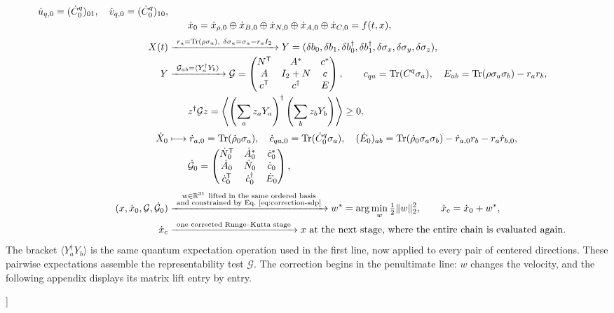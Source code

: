 \documentclass[10pt,twocolumn]{article}
\newcommand{\R}{\mathbb R}
\newcommand{\I}{I}
\newcommand{\Tr}{\operatorname{Tr}}
\newcommand{\norm}[1]{\lVert#1\rVert}
\begin{document}
{\begin{minipage}{0.97\textwidth}
\begin{equation}
\begin{aligned}
\dot u_{q,0}=(\dot C^q_0)_{01},\quad \dot v_{q,0}=(\dot C^q_0)_{10},\\[-1pt]
&\hspace{2.0em}
\dot x_0=\dot x_{\rho,0}\oplus\dot x_{B,0}\oplus\dot x_{N,0}
\oplus\dot x_{A,0}\oplus\dot x_{C,0}=f(t,x),\\[2pt]
X(t)
&\xrightarrow{\ r_a=\Tr(\rho\sigma_a),\ \delta\sigma_a=\sigma_a-r_a\I_2\ }
Y=(\delta b_0,\delta b_1,\delta b_0^\dagger,\delta b_1^\dagger,
\delta\sigma_x,\delta\sigma_y,\delta\sigma_z),\\[-1pt]
Y
&\xrightarrow{\ \mathcal G_{ab}=\langle Y_a^\dagger Y_b\rangle\ }
\mathcal G=
\begin{pmatrix}
N^{\mathsf T}&A^*&c^*\\
A&\I_2+N&c\\
c^{\mathsf T}&c^\dagger&E
\end{pmatrix},\qquad
c_{qa}=\Tr(C^q\sigma_a),\quad
E_{ab}=\Tr(\rho\sigma_a\sigma_b)-r_ar_b,\\[-1pt]
&\hspace{2.0em}
z^\dagger\mathcal Gz=
\left\langle\left(\sum_a z_aY_a\right)^\dagger
\left(\sum_b z_bY_b\right)\right\rangle\geq0,\\[2pt]
\dot X_0
&\longmapsto
\dot r_{a,0}=\Tr(\dot\rho_0\sigma_a),\quad
\dot c_{qa,0}=\Tr(\dot C^q_0\sigma_a),\quad
(\dot E_0)_{ab}=\Tr(\dot\rho_0\sigma_a\sigma_b)-\dot r_{a,0}r_b-r_a\dot r_{b,0},\\[-1pt]
&\hspace{2.0em}
\dot{\mathcal G}_0=
\begin{pmatrix}
\dot N_0^{\mathsf T}&\dot A_0^*&\dot c_0^*\\
\dot A_0&\dot N_0&\dot c_0\\
\dot c_0^{\mathsf T}&\dot c_0^\dagger&\dot E_0
\end{pmatrix},\\[2pt]
(x,\dot x_0,\mathcal G,\dot{\mathcal G}_0)
&\xrightarrow{\ \substack{w\in\R^{31}\ \text{lifted in the same ordered basis}\\
\text{and constrained by Eq.~\eqref{eq:correction-sdp}}}\ }
w^*=\arg\min_w\tfrac12\norm w_2^2,
\qquad
\dot x_{\rm c}=\dot x_0+w^*,\\[-1pt]
\dot x_{\rm c}
&\xrightarrow{\ \text{one corrected Runge--Kutta stage}\ }
x\ \text{at the next stage, where the entire chain is evaluated again.}
\end{aligned}
\label{eq:primitive-calculation-chain}
\end{equation}
The bracket $\langle Y_a^\dagger Y_b\rangle$ is the same quantum expectation
operation used in the first line, now applied to every pair of centered
directions.  These pairwise expectations assemble the representability test
$\mathcal G$.  The correction begins in the penultimate line: $w$ changes the
velocity, and the following appendix displays its matrix lift entry by entry.
\end{minipage}
\vspace{0.6em}
}]
\end{document}
